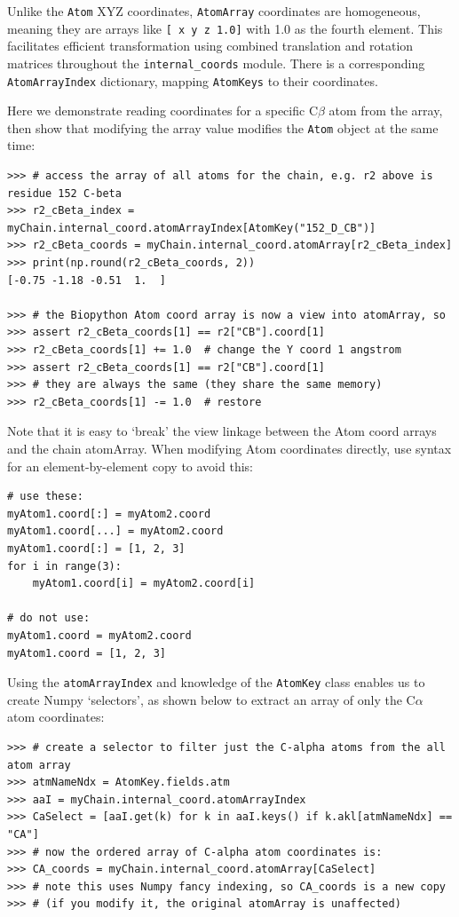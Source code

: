 Unlike the \texttt{Atom} XYZ coordinates, \texttt{AtomArray} coordinates are homogeneous, meaning
they are arrays like \texttt{[ x y z 1.0]} with 1.0 as the fourth element.  This facilitates efficient transformation using combined
translation and rotation matrices throughout the \texttt{internal\_coords} module.  There is a
corresponding \texttt{AtomArrayIndex} dictionary, mapping \texttt{AtomKeys} to their coordinates.

Here we demonstrate reading coordinates for a specific C$\beta$ atom from the array, then show
that modifying the array value modifies the \texttt{Atom} object at the same time:

\begin{verbatim}
>>> # access the array of all atoms for the chain, e.g. r2 above is residue 152 C-beta
>>> r2_cBeta_index = myChain.internal_coord.atomArrayIndex[AtomKey("152_D_CB")]
>>> r2_cBeta_coords = myChain.internal_coord.atomArray[r2_cBeta_index]
>>> print(np.round(r2_cBeta_coords, 2))
[-0.75 -1.18 -0.51  1.  ]

>>> # the Biopython Atom coord array is now a view into atomArray, so
>>> assert r2_cBeta_coords[1] == r2["CB"].coord[1]
>>> r2_cBeta_coords[1] += 1.0  # change the Y coord 1 angstrom
>>> assert r2_cBeta_coords[1] == r2["CB"].coord[1]
>>> # they are always the same (they share the same memory)
>>> r2_cBeta_coords[1] -= 1.0  # restore
\end{verbatim}

Note that it is easy to `break' the view linkage between the Atom coord arrays and the
chain atomArray.  When modifying Atom coordinates directly, use syntax for an
element-by-element copy to avoid this:

\begin{verbatim}
# use these:
myAtom1.coord[:] = myAtom2.coord
myAtom1.coord[...] = myAtom2.coord
myAtom1.coord[:] = [1, 2, 3]
for i in range(3):
    myAtom1.coord[i] = myAtom2.coord[i]

# do not use:
myAtom1.coord = myAtom2.coord
myAtom1.coord = [1, 2, 3]
\end{verbatim}


Using the \texttt{atomArrayIndex} and knowledge of the \texttt{AtomKey} class
enables us to create Numpy `selectors', as shown below to extract an array of
only the C$\alpha$ atom coordinates:

\begin{verbatim}
>>> # create a selector to filter just the C-alpha atoms from the all atom array
>>> atmNameNdx = AtomKey.fields.atm
>>> aaI = myChain.internal_coord.atomArrayIndex
>>> CaSelect = [aaI.get(k) for k in aaI.keys() if k.akl[atmNameNdx] == "CA"]
>>> # now the ordered array of C-alpha atom coordinates is:
>>> CA_coords = myChain.internal_coord.atomArray[CaSelect]
>>> # note this uses Numpy fancy indexing, so CA_coords is a new copy
>>> # (if you modify it, the original atomArray is unaffected)
\end{verbatim}


